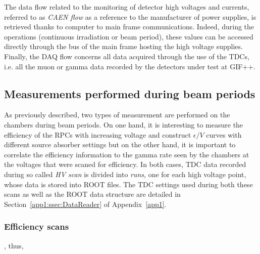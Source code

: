 	The data flow related to the monitoring of detector high voltages and currents, referred to as \textit{CAEN flow} as a reference to the manufacturer of power supplies, is retrieved thanks to computer to main frame communications. Indeed, during the operations (continuous irradiation or beam period), these values can be accessed directly through the bus of the main frame hosting the high voltage supplies. Finally, the DAQ flow concerns all data acquired through the use of the TDCs, i.e. all the muon or gamma data recorded by the detectors under test at GIF++.

	\subsection{Measurements performed during beam periods}
	\label{chapt5:ssec:beamperiods}
	
	As previously described, two types of measurement are performed on the chambers during beam periods. On one hand, it is interesting to measure the efficiency of the RPCs with increasing voltage and construct $\epsilon/V$ curves with different source absorber settings but on the other hand, it is important to correlate the efficiency information to the gamma rate seen by the chambers at the voltages that were scaned for efficiency. In both cases, TDC data recorded during so called \textit{HV scan} is divided into \textit{runs}, one for each high voltage point, whose data is stored into ROOT files. The TDC settings used during both these scans as well as the ROOT data structure are detailed in Section~\ref{app1:ssec:DataReader} of Appendix~\ref{app1}.
	
		\subsubsection{Efficiency scans}
		\label{chapt5:sssec:effscan}
	
	
	, thus, 
	
